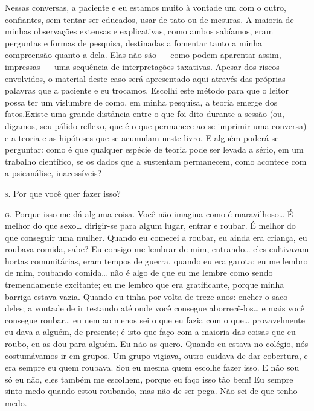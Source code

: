 Nessas conversas, a paciente e eu estamos muito à vontade um com o
outro, confiantes, sem tentar ser educados, usar de tato ou de mesuras.
A maioria de minhas observações extensas e explicativas, como ambos
sabíamos, eram perguntas e formas de pesquisa, destinadas a fomentar
tanto a minha compreensão quanto a dela. Elas não são --- como podem
aparentar assim, impressas --- uma sequência de interpretações
taxativas. Apesar dos riscos envolvidos, o material deste caso será
apresentado aqui através das próprias palavras que a paciente e eu
trocamos. Escolhi este método para que o leitor possa ter um vislumbre
de como, em minha pesquisa, a teoria emerge dos fatos.\idxcrime[|)] Existe uma
grande distância entre o que foi dito durante a sessão (ou, digamos,
seu pálido reflexo, que é o que permanece ao se imprimir uma conversa)
e a teoria e as hipóteses que se acumulam neste livro. E alguém poderá
se perguntar: como é que qualquer espécie de teoria pode ser levada a
sério, em um trabalho científico, se os dados que a sustentam
permanecem, como acontece com a psicanálise, inacessíveis?


\bigskip

\noindent\hskip0mm\textsc{s.} Por que você quer fazer isso?

\noindent\hskip0mm\textsc{g.} Porque isso me dá alguma coisa. Você não imagina como é
maravilhoso\ldots{} É melhor do que sexo\ldots{} dirigir-se para algum lugar,
entrar e roubar. É melhor do que conseguir uma mulher. Quando eu
comecei a roubar, eu ainda era criança, eu roubava comida, sabe? Eu
consigo me lembrar de mim, entrando\ldots{} eles cultivavam hortas
comunitárias, eram tempos de guerra, quando eu era garota; eu me lembro
de mim, roubando comida\ldots{} não é algo de que eu me lembre como sendo
tremendamente excitante; eu me lembro que era gratificante, porque
minha barriga estava vazia. Quando eu tinha por volta de treze anos:
encher o saco deles; a vontade de ir testando até onde você consegue
aborrecê-los\ldots{} e mais você consegue roubar\ldots{} eu nem ao menos sei o
que eu fazia com o que\ldots{} provavelmente eu dava a alguém, de presente;
é isto que faço com a maioria das coisas que eu roubo, eu as dou para
alguém. Eu não as quero. Quando eu estava no colégio, nós costumávamos
ir em grupos. Um grupo vigiava, outro cuidava de dar cobertura, e era
sempre eu quem roubava. Sou eu mesma quem escolhe fazer isso. E não sou
só eu não, eles também me escolhem, porque eu faço isso tão bem! Eu
sempre sinto medo quando estou roubando, mas não de ser pega. Não sei
de que tenho medo.

